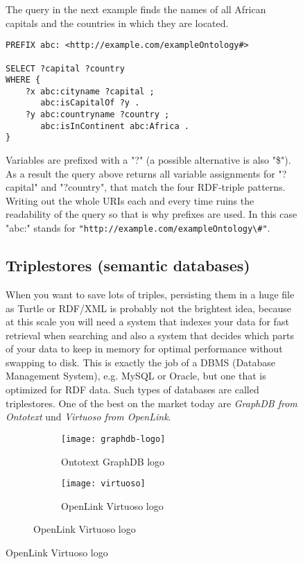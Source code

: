 \begin{figure}[h!]
The query in the next example finds the names of all African capitals and the countries in which they are located.

\begin{verbatim}
PREFIX abc: <http://example.com/exampleOntology#>

SELECT ?capital ?country
WHERE {
    ?x abc:cityname ?capital ;
       abc:isCapitalOf ?y .
    ?y abc:countryname ?country ;
       abc:isInContinent abc:Africa .
}
\end{verbatim}

Variables are prefixed with a "?" (a possible alternative is also "\$"). As a result the query above returns all variable assignments for "?capital" and "?country", that match the four RDF-triple patterns. Writing out the whole URIs each and every time ruins the readability of the query so that is why prefixes are used. In this case "abc:" stands for \verb|"http://example.com/exampleOntology\#"|.

\subsection{Triplestores (semantic databases)}
When you want to save lots of triples, persisting them in a huge file as Turtle or RDF/XML is probably not the brightest idea, because at this scale you will need a system that indexes your data for fast retrieval when searching and also a system that decides which parts of your data to keep in memory for optimal performance without swapping to disk.
This is exactly the job of a DBMS (Database Management System), e.g. MySQL or Oracle, but one that is optimized for RDF data. Such types of databases are called triplestores. One of the best on the market today are \textit{GraphDB from Ontotext} und \textit{Virtuoso from OpenLink}.

\begin{figure}[h!]
    \caption{Famous triplestore logos}
    \begin{subfigure}[b]{0.5\textwidth}
        \centering
        \texttt{[image: graphdb-logo]}
        \caption{Ontotext GraphDB logo}
        \label{fig:view}
    \end{subfigure}
    \begin{subfigure}[b]{0.5\textwidth}
        \centering
        \texttt{[image: virtuoso]}
        \caption{OpenLink Virtuoso logo}
    \label{fig:view}
    \end{subfigure}
\end{figure}


\end{figure}
